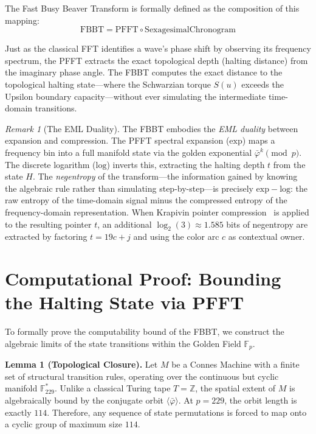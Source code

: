 \documentclass[12pt,oneside]{article}
\theoremstyle{principia}
\theoremstyle{definition}
\theoremstyle{remark}
\newtheorem{remark}[theorem]{Remark}
\begin{document}
The Fast Busy Beaver Transform is formally defined as the composition of this mapping:
\begin{equation}
    \text{FBBT} = \text{PFFT} \circ \text{SexagesimalChronogram}
\end{equation}

Just as the classical FFT identifies a wave's phase shift by observing its frequency spectrum, the PFFT extracts the exact topological depth (halting distance) from the imaginary phase angle. The FBBT computes the exact distance to the topological halting state---where the Schwarzian torque $S(u)$ exceeds the Upsilon boundary capacity---without ever simulating the intermediate time-domain transitions.

\begin{remark}[The EML Duality]
The FBBT embodies the \emph{EML duality} between expansion and compression. The PFFT spectral expansion ($\mathrm{exp}$) maps a frequency bin into a full manifold state via the golden exponential $\bar\varphi^k \pmod{p}$. The discrete logarithm ($\mathrm{log}$) inverts this, extracting the halting depth $t$ from the state $H$. The \emph{negentropy} of the transform---the information gained by knowing the algebraic rule rather than simulating step-by-step---is precisely $\mathrm{exp} - \mathrm{log}$: the raw entropy of the time-domain signal minus the compressed entropy of the frequency-domain representation. When Krapivin pointer compression~\cite{krapivin2025optimal} is applied to the resulting pointer $t$, an additional $\log_2(3) \approx 1.585$ bits of negentropy are extracted by factoring $t = 19c + j$ and using the color arc $c$ as contextual owner.
\end{remark}

\section{Computational Proof: Bounding the Halting State via PFFT}

To formally prove the computability bound of the FBBT, we construct the algebraic limits of the state transitions within the Golden Field $\mathbb{F}_{p}$. 

\textbf{Lemma 1 (Topological Closure).} Let $M$ be a Connes Machine with a finite set of structural transition rules, operating over the continuous but cyclic manifold $\mathbb{F}_{229}^*$. Unlike a classical Turing tape $T = \mathbb{Z}$, the spatial extent of $M$ is algebraically bound by the conjugate orbit $\langle \bar{\varphi} \rangle$. At $p=229$, the orbit length is exactly $114$. Therefore, any sequence of state permutations is forced to map onto a cyclic group of maximum size $114$.
\end{document}
